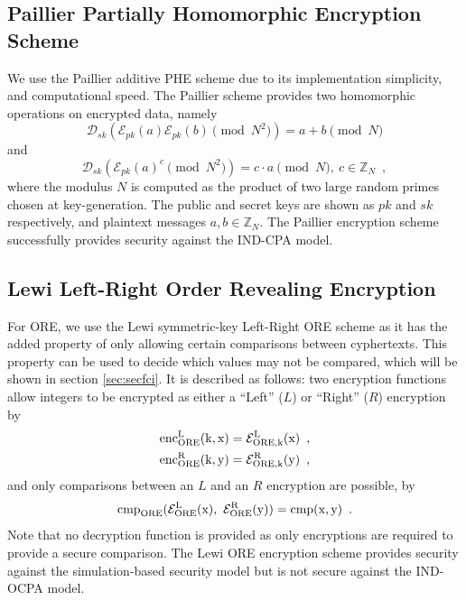 \documentclass[letterpaper, 10 pt, journal, twoside]{ieeetran}  %
\begin{document}
\subsection{Paillier Partially Homomorphic Encryption Scheme} \label{subsec:paillier}
We use the Paillier additive PHE scheme due to its implementation simplicity, and computational speed. The Paillier scheme provides two homomorphic operations on encrypted data, namely
\begin{equation}
   \mathcal{D}_{sk}(\mathcal{E}_{pk}(a)\mathcal{E}_{pk}(b) \!\!\pmod{N^{2}}) = a + b \!\!\pmod{N} \label{eqn:paillier_add}
\end{equation}
and
\begin{equation}
   \mathcal{D}_{sk}(\mathcal{E}_{pk}(a)^c \!\!\pmod{N^{2}}) = c\cdot a \!\!\pmod{N},\ c \in \mathbb{Z}_N\enspace, \label{eqn:paillier_mult}
\end{equation}
where the modulus $N$ is computed as the product of two large random primes chosen at key-generation. The public and secret keys are shown as $pk$ and $sk$ respectively, and plaintext messages $a,b \in \mathbb{Z}_N$. The Paillier encryption scheme successfully provides security against the IND-CPA model.

\subsection{Lewi Left-Right Order Revealing Encryption} \label{subsec:lewi}
For ORE, we use the Lewi symmetric-key Left-Right ORE scheme as it has the added property of only allowing certain comparisons between cyphertexts. This property can be used to decide which values may not be compared, which will be shown in section \ref{sec:secfci}. It is described as follows: two encryption functions allow integers to be encrypted as either a ``Left'' ($L$) or ``Right'' ($R$) encryption by
\begin{equation}
   \begin{aligned} \label{eqn:lewi_l_r}
      &\operatorfont{enc}^L_{ORE}(k, x) = \mathcal{E}^L_{ORE,k}(x)\enspace, \\
      &\operatorfont{enc}^R_{ORE}(k, y) = \mathcal{E}^R_{ORE,k}(y)\enspace,
   \end{aligned}
\end{equation}
and only comparisons between an $L$ and an $R$ encryption are possible, by
\begin{equation}
   \operatorfont{cmp}_{ORE}(\mathcal{E}^L_{ORE}(x),\ \mathcal{E}^R_{ORE}(y)) = \operatorfont{cmp}(x, y)\enspace. \label{eqn:lewi_cmp}
\end{equation}
Note that no decryption function is provided as only encryptions are required to provide a secure comparison. The Lewi ORE encryption scheme provides security against the simulation-based security model \cite{chenettePracticalOrderRevealingEncryption2016} but is not secure against the IND-OCPA model.
\end{document}
